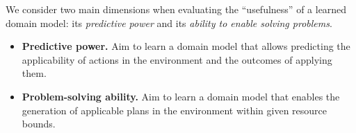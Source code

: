 \documentclass{article}
\theoremstyle{definition}
\theoremstyle{remark}
\newif\ifaddcomments
\newcommand{\roni}[1]{\ifaddcomments{\textcolor{red}{[Roni: #1]}}\fi}
\newcommand{\mauro}[1]{\ifaddcomments{\textcolor{green}{[Mauro: #1]}}\fi}
\newcommand{\gregor}[1]{\ifaddcomments{\textcolor{orange}{[Gregor: #1]}}\fi}
\begin{document}
\gregor{One general problem: the syntactic metrics all work solely on the level of the domain representation. But the metrics we propose here all require some type of actual states -- i.e.\ they are dependent on at least the set of objects that exists. Or even more they are dependent on the full problem instances. I assume we then have a selection of ``test'' problem instances as in standard machine learning?}
We consider two main dimensions when evaluating the ``usefulness'' of a learned domain model: its \emph{predictive power} and its \emph{ability to enable solving problems}.
%
\begin{itemize}
    \item \textbf{Predictive power.} Aim to learn a domain model that allows predicting the applicability of actions in the environment and the outcomes of applying them. 
    \item \textbf{Problem-solving ability.} Aim to learn a domain model that enables the generation of applicable plans in the environment within given resource bounds. %
\end{itemize}
\end{document}
